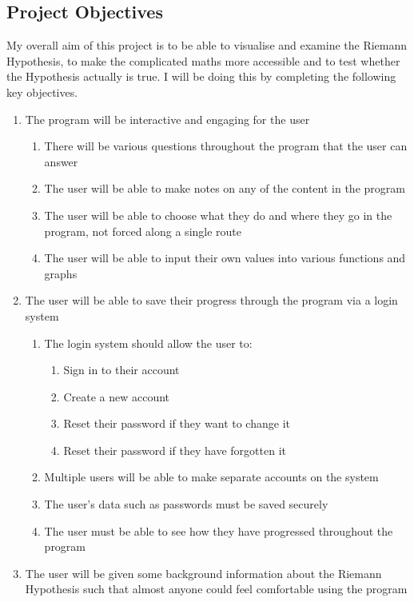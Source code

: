 \documentclass{article}
\begin{document}
\subsection{Project Objectives}
My overall aim of this project is to be able to visualise and examine the Riemann Hypothesis, to make the complicated maths more accessible and to test whether the Hypothesis actually is true. I will be doing this by completing the following key objectives.
\begin{enumerate}
    \item The program will be interactive and engaging for the user
        \begin{enumerate}
            \item There will be various questions throughout the program that the user can answer
            \item The user will be able to make notes on any of the content in the program
            \item The user will be able to choose what they do and where they go in the program, not forced along a single route
            \item The user will be able to input their own values into various functions and graphs
        \end{enumerate}
    \item The user will be able to save their progress through the program via a login system
    \begin{enumerate}
        \item The login system should allow the user to:
        \begin{enumerate}
            \item Sign in to their account
            \item Create a new account
            \item Reset their password if they want to change it
            \item Reset their password if they have forgotten it
        \end{enumerate}
        \item Multiple users will be able to make separate accounts on the system
        \item The user's data such as passwords must be saved securely
        \item The user must be able to see how they have progressed throughout the program
    \end{enumerate}
    \item The user will be given some background information about the Riemann Hypothesis such that almost anyone could feel comfortable using the program

\end{enumerate}
\end{document}

